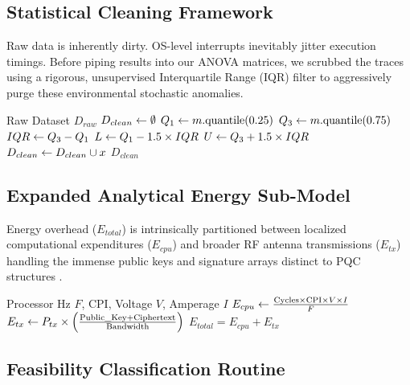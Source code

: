 \subsection{Statistical Cleaning Framework}

Raw data is inherently dirty. OS-level interrupts inevitably jitter execution timings. Before piping results into our ANOVA matrices, we scrubbed the traces using a rigorous, unsupervised Interquartile Range (IQR) filter to aggressively purge these environmental stochastic anomalies.

\begin{algorithm}
\caption{IQR Metric Outlier Purge}\label{alg:iqr}
\begin{algorithmic}[1]
\Require Raw Dataset $D_{raw}$
\State $D_{clean} \gets \emptyset$
 \State $Q_1 \gets m.\text{quantile}(0.25)$
 \State $Q_3 \gets m.\text{quantile}(0.75)$
 \State $IQR \gets Q_3 - Q_1$
 \State $L \gets Q_1 - 1.5 \times IQR$ 
 \State $U \gets Q_3 + 1.5 \times IQR$ 
 \State $D_{clean} \gets D_{clean} \cup x$
 \EndIf
\EndFor
\State \Return $D_{clean}$
\end{algorithmic}
\end{algorithm}

\subsection{Expanded Analytical Energy Sub-Model}

Energy overhead ($E_{total}$) is intrinsically partitioned between localized computational expenditures ($E_{cpu}$) and broader RF antenna transmissions ($E_{tx}$) handling the immense public keys and signature arrays distinct to PQC structures \cite{zhang2008energy}.

\begin{algorithm}
\caption{Aggregate Physical Energy Approximation}\label{alg:energy}
\begin{algorithmic}[1]
\Require Processor Hz $F$, CPI, Voltage $V$, Amperage $I$
\State $E_{cpu} \gets \frac{\text{Cycles} \times \text{CPI} \times V \times I}{F}$
\State $E_{tx} \gets P_{tx} \times \left( \frac{\text{Public\_Key} + \text{Ciphertext}}{\text{Bandwidth}} \right)$
\State \Return $E_{total} = E_{cpu} + E_{tx}$
\end{algorithmic}
\end{algorithm}

\subsection{Feasibility Classification Routine}

